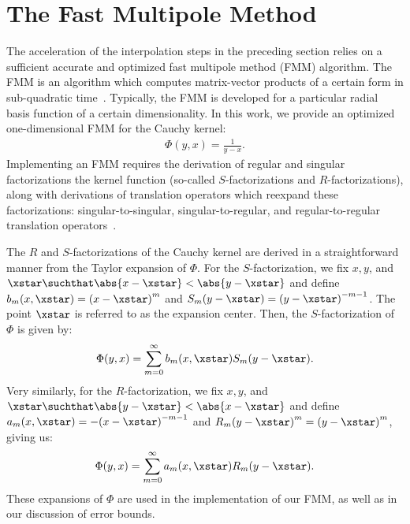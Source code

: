 \section{The Fast Multipole Method}

The acceleration of the interpolation steps in the preceding section
relies on a sufficient accurate and optimized fast multipole method
(FMM) algorithm. The FMM is an algorithm which computes matrix-vector
products of a certain form in sub-quadratic
time~\cite{fmm-orig}. Typically, the FMM is developed for a particular
radial basis function of a certain dimensionality. In this work, we
provide an optimized one-dimensional FMM for the Cauchy kernel:
\begin{align}
  \label{eq:cauchy-kernel}
  \Phi(y, x) = \frac{1}{y - x}.
\end{align}
Implementing an FMM requires the derivation of regular and singular
factorizations the kernel function (so-called $S$-factorizations and
$R$-factorizations), along with derivations of translation operators
which reexpand these factorizations: singular-to-singular,
singular-to-regular, and regular-to-regular translation
operators~\cite{fmm-helmholtz}.

The $R$ and $S$-factorizations of the Cauchy kernel are derived in a
straightforward manner from the Taylor expansion of $\Phi$. For the
$S$-factorization, we fix $x, y$, and
$\xstar \suchthat \abs{x-\xstar} < \abs{y-\xstar}$ and define
$b_m(x, \xstar) = {(x - \xstar)}^m$ and
$S_m(y - \xstar) = {(y - \xstar)}^{-m-1}$. The point $\xstar$ is
referred to as the expansion center. Then, the $S$-factorization of
$\Phi$ is given by:
\begin{align}
  \label{eq:S-factorization}
  \Phi(y, x) = \sum_{m=0}^\infty b_m(x, \xstar) S_m(y - \xstar).
\end{align}
Very similarly, for the $R$-factorization, we fix $x, y$, and
$\xstar \suchthat \abs{y - \xstar} < \abs{x - \xstar}$ and define
$a_m(x, \xstar) = -{(x - \xstar)}^{-m-1}$ and
$R_m{(y - \xstar)}^m = {(y - \xstar)}^m$, giving us:
\begin{align}
  \label{eq:R-factorization}
  \Phi(y, x) = \sum_{m=0}^\infty a_m(x, \xstar) R_m(y - \xstar).
\end{align}
These expansions of $\Phi$ are used in the implementation of our FMM,
as well as in our discussion of error bounds.

